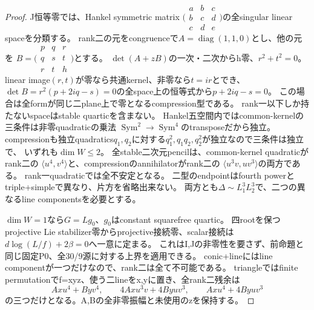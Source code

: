 \documentclass[a4paper,11pt]{ltjsarticle}
\theoremstyle{definition}
\begin{document}
\begin{proof}
J恒等零では、Hankel symmetric matrix
$\bigl(\begin{smallmatrix}a&b&c\\b&c&d\\c&d&e\end{smallmatrix}\bigr)$の全singular linear spaceを分類する。
rank二の元をcongruenceで$A=\operatorname{diag}(1,1,0)$とし、他の元を
$B=\bigl(\begin{smallmatrix}p&q&r\\q&s&t\\r&t&h\end{smallmatrix}\bigr)$とする。
$\det(A+zB)$の一次・二次からh零、$r^2+t^2=0$。
linear image$(r,t)$が零なら共通kernel、非零なら$t=ir$とでき、
$\det B=r^2(p+2iq-s)=0$の全space上の恒等式から$p+2iq-s=0$。
この場合は全formが同じ二plane上で零となるcompression型である。
rank一以下しか持たないspaceはstable quarticを含まない。
Hankel五空間内ではcommon-kernelの三条件は非零quadraticの乗法
$\operatorname{Sym}^2\to\operatorname{Sym}^4$のtransposeだから独立。
compressionも独立quadratics$q_1,q_2$に対する$q_1^2,q_1q_2,q_2^2$が独立なので三条件は独立で、
いずれも$\dim W\le2$。
全stable二次元pencilは、common-kernel quadraticがrank二の
$\langle u^4,v^4\rangle$と、compressionのannihilatorがrank二の
$\langle u^3v,uv^3\rangle$の両方である。
rank一quadraticでは全不安定となる。
二型のendpointはfourth powerとtriple+simpleで異なり、片方を省略出来ない。
両方とも$\Delta\sim L_1^3L_2^3$で、二つの異なるline componentsを必要とする。

$\dim W=1$なら$G=L g_0$、$g_0$はconstant squarefree quartic。
四rootを保つprojective Lie stabilizer零からprojective接続零、scalar接続は
$d\log(L/f)+2\beta=0$へ一意に定まる。
これはI,Jの非零性を要さず、前命題と同じ固定P0、全30/9源に対する上界を適用できる。
conic+lineにはline componentが一つだけなので、rank二は全て不可能である。
triangleではfinite permutationでf=xyz、使う二lineをx,yに置き、全rank二残余は
\[
 Axu^4+Byv^4,\qquad4Axu^3v+4Byuv^3,\qquad Axu^4+4Byuv^3
\]
の三つだけとなる。A,Bの全非零振幅と未使用のzを保持する。


\end{proof}
\end{document}
